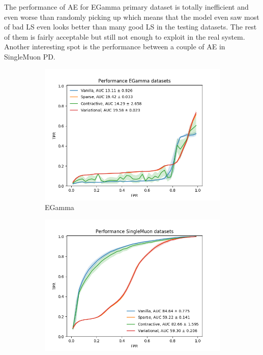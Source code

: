 The performance of AE for EGamma primary dataset is totally inefficient and even worse than randomly picking up which means that the model even saw most of bad LS even looks better than many good LS in the testing datasets. The rest of them is fairly acceptable but still not enough to exploit in the real system. Another interesting spot is the performance between a couple of AE in SingleMuon PD. 

\begin{figure}[h!]
\centering
    \begin{subfigure}[b]{0.49\linewidth}
        \includegraphics[width=\linewidth]{images/reco/2018/feature_1/performance_EGamma_VanillaSparseContractiveVariational.png}
        \caption{EGamma}
    \end{subfigure}
    \begin{subfigure}[b]{0.49\linewidth}
        \includegraphics[width=\linewidth]{images/reco/2018/feature_1/performance_SingleMuon_VanillaSparseContractiveVariational.png}

\end{subfigure}
\end{figure}
